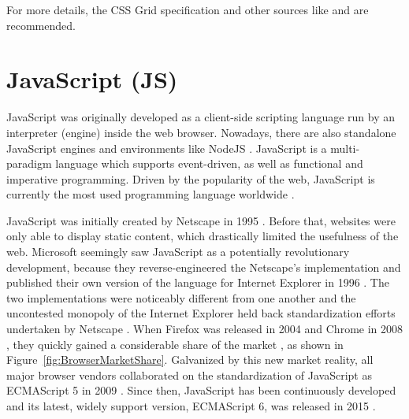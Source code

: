 For more details, the CSS Grid specification \parencite{CSSGrid} and
other sources like \textcite{GridLayoutInCSS} and
\textcite{House-GridGuide} are recommended.




\section{JavaScript (JS)}
\label{sec:JS}

JavaScript was originally developed as a client-side scripting
language run by an interpreter (engine) inside the web browser.
Nowadays, there are also standalone JavaScript engines and
environments like NodeJS \parencite{NodeJS}. JavaScript is a
multi-paradigm language which supports event-driven, as well as
functional and imperative programming. Driven by the popularity of the
web, JavaScript is currently the most used programming language
worldwide \parencite{StatisticProgrammingLanguageUsage}.

JavaScript was initially created by Netscape in 1995
\parencite{JSFirstRelease}. Before that, websites were only able to
display static content, which drastically limited the usefulness of
the web. Microsoft seemingly saw JavaScript as a potentially
revolutionary development, because they reverse-engineered the
Netscape's implementation and published their own version of the
language for Internet Explorer in 1996 \parencite{JSIERelease}. The
two implementations were noticeably different from one another and the
uncontested monopoly of the Internet Explorer
\parencite{BrowserMarketShareEarly} held back standardization efforts
undertaken by Netscape \parencite{ECMAScript1}. When Firefox was
released in 2004 \parencite{FirefoxFirstRelease} and Chrome in 2008
\parencite{ChromeFirstRelease}, they quickly gained a considerable
share of the market \parencite{BrowserMarketShare}, as shown in
Figure~\ref{fig:BrowserMarketShare}. Galvanized by this new market
reality, all major browser vendors collaborated on the standardization
of JavaScript as ECMAScript 5 in 2009 \parencite{ECMAScript5}. Since
then, JavaScript has been continuously developed and its latest,
widely support version, ECMAScript 6, was released in 2015
\parencite{ECMAScript6}.



